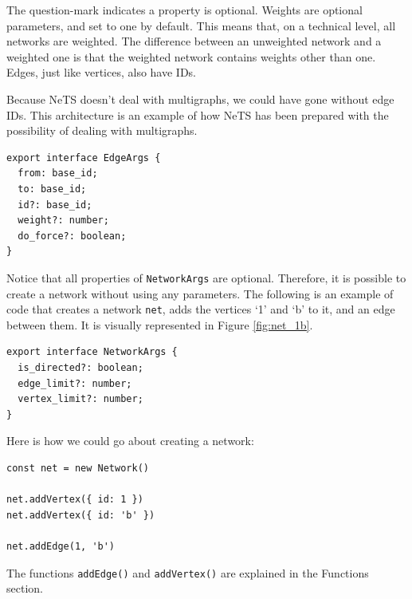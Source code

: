 The question-mark indicates a property is optional.
Weights are optional parameters, and set to one by default.
This means that, on a technical level, all networks are weighted.
The difference between an unweighted network and a weighted one
is that the weighted network contains weights other than one.
Edges, just like vertices, also have IDs.

Because NeTS doesn't deal with multigraphs, we
could have gone without edge IDs.
This architecture is an example of how NeTS
has been prepared with the possibility of dealing
with multigraphs.

\begin{verbatim}
export interface EdgeArgs {
  from: base_id;
  to: base_id;
  id?: base_id;
  weight?: number;
  do_force?: boolean;
}
\end{verbatim}

Notice that all properties of \texttt{NetworkArgs} are optional.
Therefore, it is possible to create a network without using any parameters.
The following is an example of code that creates a network \texttt{net},
adds the vertices `1' and `b' to it, and an edge between them.
It is visually represented in Figure \ref{fig:net_1b}.

\begin{verbatim}
export interface NetworkArgs {
  is_directed?: boolean;
  edge_limit?: number;
  vertex_limit?: number;
}
\end{verbatim}

Here is how we could go about creating a network:

\begin{verbatim}
const net = new Network()

net.addVertex({ id: 1 })
net.addVertex({ id: 'b' })

net.addEdge(1, 'b')
\end{verbatim}

The functions \texttt{addEdge()} and \texttt{addVertex()}
are explained in the Functions section.

